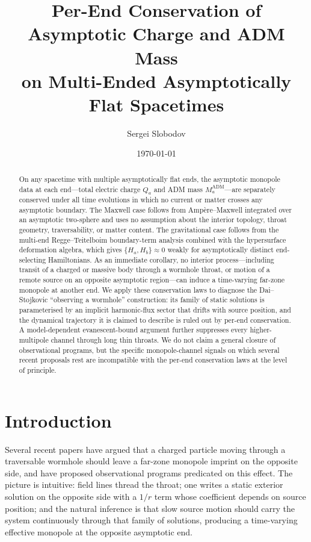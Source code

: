 \documentclass[aps,prd,onecolumn,nofootinbib,superscriptaddress]{revtex4-2}
\begin{document}
\title{Per-End Conservation of Asymptotic Charge and ADM Mass\\
on Multi-Ended Asymptotically Flat Spacetimes}

\author{Sergei Slobodov}

\date{\today}

\begin{abstract}
On any spacetime with multiple asymptotically flat ends, the asymptotic monopole data at each end---total electric charge $Q_a$ and ADM mass $M_a^{\mathrm{ADM}}$---are separately conserved under all time evolutions in which no current or matter crosses any asymptotic boundary. The Maxwell case follows from Amp\`ere--Maxwell integrated over an asymptotic two-sphere and uses no assumption about the interior topology, throat geometry, traversability, or matter content. The gravitational case follows from the multi-end Regge--Teitelboim boundary-term analysis combined with the hypersurface deformation algebra, which gives $\{H_a, H_b\} \approx 0$ weakly for asymptotically distinct end-selecting Hamiltonians. As an immediate corollary, no interior process---including transit of a charged or massive body through a wormhole throat, or motion of a remote source on an opposite asymptotic region---can induce a time-varying far-zone monopole at another end. We apply these conservation laws to diagnose the Dai--Stojkovic ``observing a wormhole'' construction: its family of static solutions is parameterised by an implicit harmonic-flux sector that drifts with source position, and the dynamical trajectory it is claimed to describe is ruled out by per-end conservation. A model-dependent evanescent-bound argument further suppresses every higher-multipole channel through long thin throats. We do not claim a general closure of observational programs, but the specific monopole-channel signals on which several recent proposals rest are incompatible with the per-end conservation laws at the level of principle.
\end{abstract}

\maketitle

\section{Introduction}
\label{sec:intro}

Several recent papers have argued that a charged particle moving through a traversable wormhole should leave a far-zone monopole imprint on the opposite side, and have proposed observational programs predicated on this effect.\cite{DaiStojkovic2019Observing,DaiStojkovic2020ReplyObserving,SimonettiEtAl2021SensitiveSearches,BaoHouZhang2023GWScattering,BambiStojkovic2021AstrophysicalWormholes} The picture is intuitive: field lines thread the throat; one writes a static exterior solution on the opposite side with a $1/r$ term whose coefficient depends on source position; and the natural inference is that slow source motion should carry the system continuously through that family of solutions, producing a time-varying effective monopole at the opposite asymptotic end.
\end{document}
